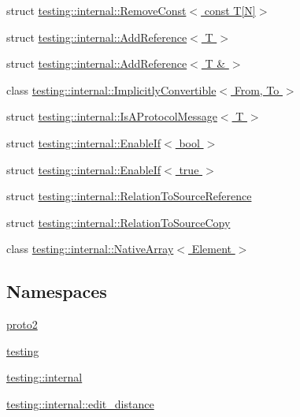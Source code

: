 \begin{DoxyCompactItemize}
struct \hyperlink{structtesting_1_1internal_1_1_remove_const_3_01const_01_t[_n]_4}{testing\+::internal\+::\+Remove\+Const$<$ const T\mbox{[}\+N\mbox{]}$>$}
\item 
struct \hyperlink{structtesting_1_1internal_1_1_add_reference}{testing\+::internal\+::\+Add\+Reference$<$ T $>$}
\item 
struct \hyperlink{structtesting_1_1internal_1_1_add_reference_3_01_t_01_6_01_4}{testing\+::internal\+::\+Add\+Reference$<$ T \& $>$}
\item 
class \hyperlink{classtesting_1_1internal_1_1_implicitly_convertible}{testing\+::internal\+::\+Implicitly\+Convertible$<$ From, To $>$}
\item 
struct \hyperlink{structtesting_1_1internal_1_1_is_a_protocol_message}{testing\+::internal\+::\+Is\+A\+Protocol\+Message$<$ T $>$}
\item 
struct \hyperlink{structtesting_1_1internal_1_1_enable_if}{testing\+::internal\+::\+Enable\+If$<$ bool $>$}
\item 
struct \hyperlink{structtesting_1_1internal_1_1_enable_if_3_01true_01_4}{testing\+::internal\+::\+Enable\+If$<$ true $>$}
\item 
struct \hyperlink{structtesting_1_1internal_1_1_relation_to_source_reference}{testing\+::internal\+::\+Relation\+To\+Source\+Reference}
\item 
struct \hyperlink{structtesting_1_1internal_1_1_relation_to_source_copy}{testing\+::internal\+::\+Relation\+To\+Source\+Copy}
\item 
class \hyperlink{classtesting_1_1internal_1_1_native_array}{testing\+::internal\+::\+Native\+Array$<$ Element $>$}
\end{DoxyCompactItemize}
\subsection*{Namespaces}
\begin{DoxyCompactItemize}
\item 
 \hyperlink{namespaceproto2}{proto2}
\item 
 \hyperlink{namespacetesting}{testing}
\item 
 \hyperlink{namespacetesting_1_1internal}{testing\+::internal}
\item 
 \hyperlink{namespacetesting_1_1internal_1_1edit__distance}{testing\+::internal\+::edit\+\_\+distance}
\end{DoxyCompactItemize}
